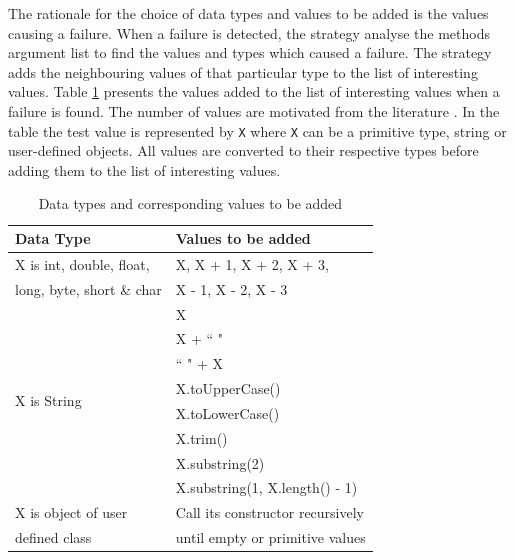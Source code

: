 The rationale for the choice of data types and values to be added is the values causing a failure. When a failure is detected, the strategy analyse the methods argument list to find the values and types which caused a failure. The strategy adds the neighbouring values of that particular type to the list of interesting values. Table \ref{table:addvalues2} presents the values added to the list of interesting values when a failure is found. The number of values are motivated from the literature \cite{ramachandran2003testing, reid1997empirical}. In the table the test value is represented by \verb+X+ where \verb+X+ can be a primitive type, string or user-defined objects. All values are converted to their respective types before adding them to the list of interesting values.

\bigskip

\begin{table}[H]
\caption{Data types and corresponding values to be added} %
\centering %
{\renewcommand{\arraystretch}{1} 
\begin{tabular}{| l | l |} %
\hline\hline %
Data Type & Values to be added\\ [0.5ex] %
\hline %
\multirow{1}{*}{X is int, double, float, } & X,  X + 1, X + 2, X + 3,  \\ %
\multirow{1}{*}{long, byte, short \& char} & X - 1, X - 2, X - 3 \\ 

\hline
\multirow{8}{*}{X is String} & X\\ %

& X + ``  "\\ %
& ``  " + X \\ %
& X.toUpperCase() \\
& X.toLowerCase() \\
& X.trim() \\
& X.substring(2) \\
& X.substring(1, X.length() - 1) \\
\hline
\multirow{1}{*}{X is object of user} & Call its constructor recursively \\ %
\multirow{1}{*}{defined class} & until empty or primitive values \\[1ex]
\hline
\hline %
\end{tabular}
}
\label{table:addvalues2} %
\end{table}


